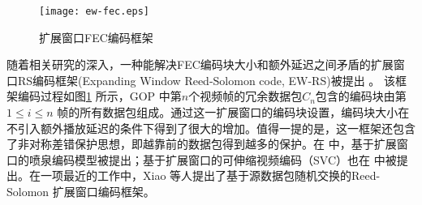 \begin{figure}[htbp]
  \centering
  \texttt{[image: ew-fec.eps]}
  \caption{扩展窗口FEC编码框架}
  \label{fig:ew_fec}
\end{figure}

随着相关研究的深入，一种能解决FEC编码块大小和额外延迟之间矛盾的扩展窗口RS编码框架(Expanding Window Reed-Solomon code, EW-RS)被提出 \cite{sejdinovic2009expanding}。 该框架编码过程如图\ref{fig:ew_fec} 所示，GOP 中第$n$个视频帧的冗余数据包$C_n$包含的编码块由第$1\le i\le n$ 帧的所有数据包组成。通过这一扩展窗口的编码块设置，编码块大小在不引入额外播放延迟的条件下得到了很大的增加。值得一提的是，这一框架还包含了非对称差错保护思想，即越靠前的数据包得到越多的保护。在 \cite{sejdinovic2009expanding, nazir2011expanding} 中，基于扩展窗口的喷泉编码模型被提出；基于扩展窗口的可伸缩视频编码（SVC）也在 \cite{vukobratovic2009scalable, hellge2011layer} 中被提出。在一项最近的工作中，Xiao \cite{xiao2013real} 等人提出了基于源数据包随机交换的Reed-Solomon 扩展窗口编码框架。
